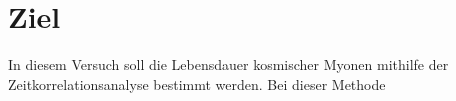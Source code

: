\section{Ziel}
\label{sec:Ziel}

In diesem Versuch soll die Lebensdauer kosmischer Myonen mithilfe der Zeitkorrelationsanalyse bestimmt werden.
Bei dieser Methode 